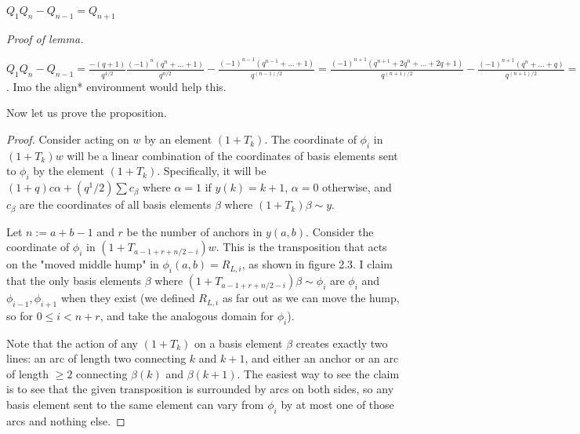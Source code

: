 \documentclass{amsart}
\begin{document}
\begin{lemma}
	$Q_1Q_n-Q_{n-1}=Q_{n+1}$
\end{lemma}

\textit{Proof of lemma.}

$Q_1Q_n-Q_{n-1}=\frac{-(q+1)}{q^{1/2}}\frac{(-1)^n(q^n+...+1)}{q^{n/2}}-\frac{(-1)^{n-1}(q^{n-1}+...+1)}{q^{(n-1)/2}}=\frac{(-1)^{n+1}(q^{n+1}+2q^n+...+2q+1)}{q^{(n+1)/2}}-\frac{(-1)^{n+1}(q^n+...+q)}{q^{(n+1)/2}}=\frac{(-1)^{n+1}(q^{n+1}+...+1)}{q^{(n+1)/2}}=Q_{n+1}$.
{\color{magenta} Imo the align* environment would help this.}

Now let us prove the proposition.

\begin{proof}
	Consider acting on $w$ by an element $(1+T_k)$. The coordinate of $\phi_i$ in $(1+T_k)w$ will be a linear combination of the coordinates of basis elements sent to $\phi_i$ by the element $(1+T_k)$. Specifically, it will be $(1+q)c\alpha+(q^1/2)\sum c_\beta$ where $\alpha=1$ if $y(k)=k+1$, $\alpha=0$ otherwise, and $c_\beta$ are the coordinates of all basis elements $\beta$ where $(1+T_k)\beta\sim y$.
	
	Let $n:=a+b-1$ and $r$ be the number of anchors in $y(a,b)$. Consider the coordinate of $\phi_i$ in $(1+T_{a-1+r+n/2-i})w$. This is the transposition that acts on the "moved middle hump" in $\phi_i(a,b)=R_{L,i}$, as shown in figure 2.3. I claim that the only basis elements $\beta$ where $(1+T_{a-1+r+n/2-i})\beta\sim \phi_i$ are $\phi_i$ and $\phi_{i-1},\phi_{i+1}$ when they exist (we defined $R_{L,i}$ as far out as we can move the hump, so for $0\leq i<n+r$, and take the analogous domain for $\phi_i$).
	
	Note that the action of any $(1+T_k)$ on a basis element $\beta$ creates exactly two lines: an arc of length two connecting $k$ and $k+1$, and either an anchor or an arc of length $\geq 2$ connecting $\beta(k)$ and $\beta(k+1)$. The easiest way to see the claim is to see that the given transposition is surrounded by arcs on both sides, so any basis element sent to the same element can vary from $\phi_i$ by at most one of those arcs and nothing else. 
	

\end{proof}
\end{document}

